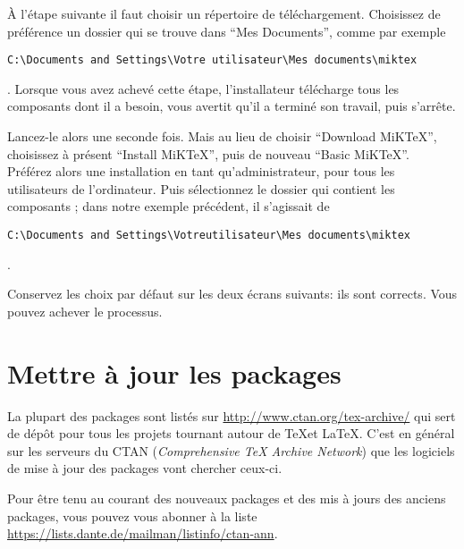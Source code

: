 À l'étape suivante il faut choisir un répertoire de téléchargement. Choisissez de préférence un dossier qui se trouve dans \enquote{Mes Documents}, comme par exemple \begin{english}\verb|C:\Documents and Settings\Votre utilisateur\Mes documents\miktex|\end{english}. Lorsque vous avez achevé cette étape, l'installateur télécharge tous les composants dont il a besoin, vous avertit qu'il a terminé son travail, puis s'arrête.

Lancez-le alors une seconde fois. Mais au lieu de choisir \enquote{Download MiKTeX}, choisissez à présent \enquote{Install MiKTeX}, puis de nouveau \enquote{Basic MiKTeX}. Préférez alors une installation en tant qu'administrateur, pour tous les utilisateurs de l'ordinateur. Puis sélectionnez le dossier qui contient les composants ; dans notre exemple précédent, il s'agissait de \begin{english}\verb|C:\Documents and Settings\Votreutilisateur\Mes documents\miktex|\end{english}.

Conservez les choix par défaut sur les deux écrans suivants: ils sont corrects. Vous pouvez achever le processus.







\section{Mettre à jour les packages}\label{maj}

La plupart des packages sont listés sur  \url{http://www.ctan.org/tex-archive/} qui sert de dépôt pour tous les projets tournant autour de \TeX et \LaTeX. C'est  en général sur les serveurs du CTAN (\textenglish{\emph{Comprehensive TeX Archive Network}}) que les logiciels de mise à jour des packages vont chercher  ceux-ci.

\begin{plusloins}
	Pour être tenu au courant des nouveaux packages et des mis à jours des anciens packages, vous pouvez vous abonner à la liste \url{https://lists.dante.de/mailman/listinfo/ctan-ann}. 
\end{plusloins}

